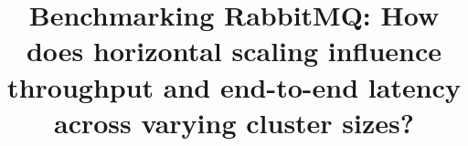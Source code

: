 \documentclass[conference, 10pt]{IEEEtran}
\begin{document}
\title{Benchmarking RabbitMQ: How does horizontal scaling influence
throughput and end-to-end latency across varying cluster sizes?\\
}

\author{
}

\maketitle







\newpage
\printbibliography
\end{document}
